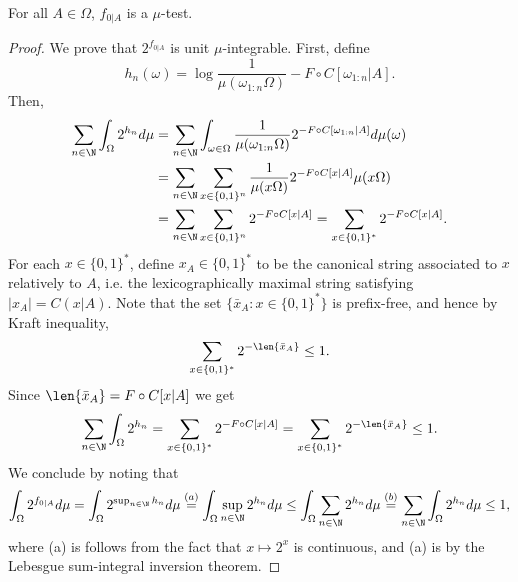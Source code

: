 \begin{theorem}
    For all $A \in \Omega$, $f_{0|A}$ is a $\mu$-test.
\end{theorem}
\begin{proof}
    We prove that $2^{f_{0|A}}$ is unit $\mu$-integrable. First, define 
    \begin{equation}
        h_n(\omega) =  \log \frac{1}{\mu(\omega_{1:n}\Omega)} - F \circ C [\omega_{1:n}|A].
    \end{equation}
    Then,
    \begin{align}
        \sum_{n\in \N} \int_\Omega 2^{h_n} d\mu & = \sum_{n \in \N} \int_{\omega \in \Omega} \frac{1}{\mu(\omega_{1:n}\Omega)} 2^{- F \circ C [\omega_{1:n}|A]} d\mu(\omega)\\
        & = \sum_{n \in \N} \sum_{x \in \{0,1\}^n} \frac{1}{\mu(x\Omega)} 2^{- F \circ C [x|A]} \mu(x \Omega)\\
        & = \sum_{n \in \N} \sum_{x \in \{0,1\}^n} 2^{- F \circ C [x|A]} = \sum_{x \in \{0,1\}^\ast} 2^{- F \circ C [x|A]}.
    \end{align}
    For each $x \in \{0,1\}^\ast$, define $x_A \in \{0,1\}^\ast$ to be the canonical string associated to $x$ relatively to $A$, i.e. the lexicographically maximal string satisfying $|x_A| = C(x|A)$. Note that the set $\{ \bar x_A : x \in \{0,1\}^\ast\}$ is prefix-free, and hence by Kraft inequality,
    \begin{equation}
        \sum_{x \in \{0,1\}^\ast} 2^{-\len{\bar x_A}} \leq 1.
    \end{equation}
    Since $\len{\bar x_A} = F \circ C[x|A]$ we get 
    \begin{equation}
        \sum_{n\in \N} \int_\Omega 2^{h_n} = \sum_{x \in \{0,1\}^\ast} 2^{- F \circ C [x|A]} = \sum_{x \in \{0,1\}^\ast} 2^{-\len{\bar x_A}} \leq 1.
    \end{equation}
    We conclude by noting that 
    \begin{align}
        \int_\Omega 2^{f_{0|A}} d\mu = \int_\Omega  2^{\sup_{n\in \N} h_n} d\mu \overset{(a)}{=}  \int_\Omega \sup_{n\in \N} 2^{h_n} d\mu
        \leq \int_\Omega \sum_{n\in \N} 2^{h_n} d\mu
        \overset{(b)}{=} \sum_{n\in \N} \int_\Omega 2^{h_n} d\mu
        \leq 1,
    \end{align}
    where (a) is follows from the fact that $x \mapsto 2^x$ is continuous, and (a) is by the Lebesgue sum-integral inversion theorem.
\end{proof}


